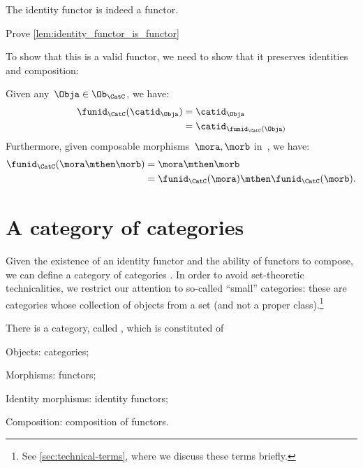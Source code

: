 \begin{lemma}
    \label{lem:identity_functor_is_functor}
    The identity functor is indeed a functor.
\end{lemma}

\begin{exercise}
    Prove \cref{lem:identity_functor_is_functor}
\end{exercise}
\begin{solution}
    To show that this is a valid functor, we need to show that it preserves identities and composition:
    \begin{compactitem}
        \item Given any~$\Obja \in \Ob_\CatC$, we have:
        \begin{equation*}
            \begin{aligned}
                \funid_{\CatC}(\catid_\Obja)&=\catid_\Obja\\
                &=\catid_{\funid_{\CatC}(\Obja)}
            \end{aligned}
        \end{equation*}
        Furthermore, given composable morphisms~$\mora,\morb$ in~\CatC, we have:
        \begin{equation*}
            \begin{aligned}
                \funid_{\CatC}(\mora\mthen\morb)&=\mora\mthen\morb\\
                &=\funid_{\CatC}(\mora)\mthen \funid_{\CatC} (\morb).
            \end{aligned}
        \end{equation*}
    \end{compactitem}
\end{solution}


\section{A category of categories}

Given the existence of an identity functor and the ability of functors to compose, we can define a category of categories \Category.
In order to avoid set-theoretic technicalities, we restrict our attention to so-called ``small'' categories: these are categories whose collection of objects from a set (and not a proper class).\footnote{See \cref{sec:technical-terms}, where we discuss these terms briefly.}

\begin{ctdefinition}
    \label{def:Category}
    There is a category, called \Category, which is constituted of
    \begin{compactitem}
        \item Objects: categories;
        \item Morphisms: functors;
        \item Identity morphisms: identity functors;
        \item Composition: composition of functors.
    \end{compactitem}
\end{ctdefinition}

